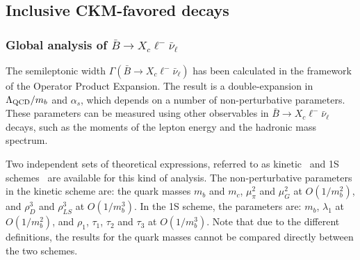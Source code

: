 \subsection{Inclusive CKM-favored decays}
\label{slbdecays_b2cincl}

\subsubsection{Global analysis of $\bar B\to X_c\ell^-\bar\nu_\ell$}

The semileptonic width $\Gamma(\bar B\to X_c\ell^-\bar\nu_\ell)$ has
been calculated in the framework of the Operator Product
Expansion. The result is a double-expansion in $\Lambda_{\rm QCD}/m_b$
and $\alpha_s$, which depends on a number of non-perturbative
parameters. These parameters can be measured using other observables
in $\bar B\to X_c\ell^-\bar\nu_\ell$ decays, such as the moments of
the lepton energy and the hadronic mass spectrum.

Two independent sets of theoretical expressions, referred to as
kinetic~\cite{Benson:2003kp,Gambino:2004qm,Gambino:2011cq} and 1S
schemes~\cite{Bauer:2004ve} are available for this kind of
analysis. The non-perturbative parameters in the kinetic scheme
are: the quark masses $m_b$ and $m_c$, $\mu^2_\pi$ and
$\mu^2_G$ at $O(1/m^2_b)$, and $\rho^3_D$ and $\rho^3_{LS}$ at
$O(1/m^3_b)$. In the 1S scheme, the parameters are: $m_b$, $\lambda_1$
at $O(1/m^2_b)$, and $\rho_1$, $\tau_1$, $\tau_2$ and $\tau_3$ at
$O(1/m^3_b)$. Note that due to the different definitions, the results
for the quark masses cannot be compared directly between the two
schemes.

